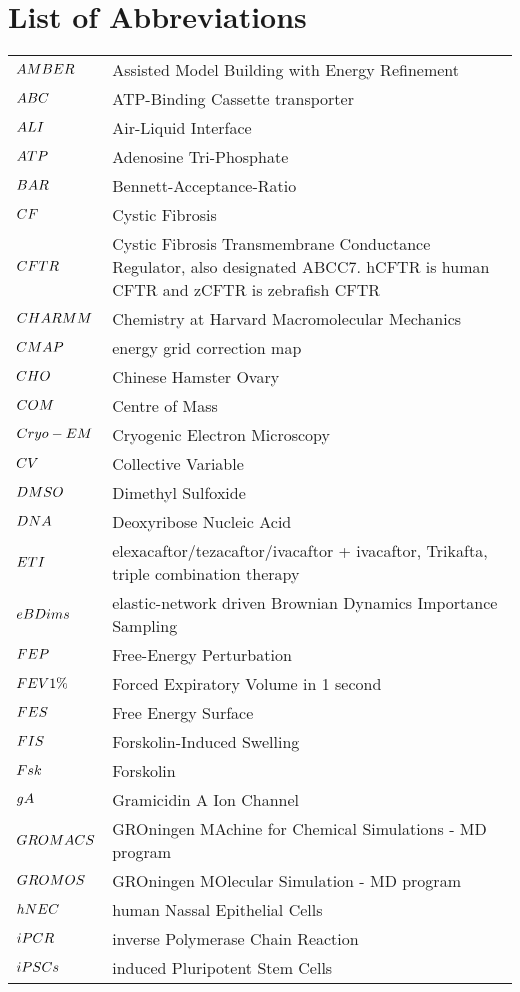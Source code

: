 \chapter*{List of Abbreviations}
\label{chap:abbrev}

\begin{center}
\begin{bfseries}
\newcommand\nomenclature[2]{#1 & #2 \\}
\begin{longtable}{@{}p{3cm}@{}p{\dimexpr\textwidth-1cm\relax}@{}}
\nomenclature{${\small AMBER}$}    {Assisted Model Building with Energy Refinement}
\nomenclature{${\small ABC}$}   {ATP-Binding Cassette transporter}
\nomenclature{${\small ALI}$}   {Air-Liquid Interface}
\nomenclature{${\small ATP}$}      {Adenosine Tri-Phosphate}
\nomenclature{${\small BAR}$}      {Bennett-Acceptance-Ratio}
\nomenclature{${\small CF}$}        {Cystic Fibrosis}
\nomenclature{${\small CFTR}$}      {Cystic Fibrosis Transmembrane Conductance Regulator, also designated ABCC7. hCFTR is human CFTR and zCFTR is zebrafish CFTR}
\nomenclature{${\small CHARMM}$}   {Chemistry at Harvard Macromolecular Mechanics}
\nomenclature{${\small CMAP}$}     {energy grid correction map}
\nomenclature{${\small CHO}$}      {Chinese Hamster Ovary}
\nomenclature{${\small COM}$}      {Centre of Mass}
\nomenclature{${\small Cryo-EM}$}  {Cryogenic Electron Microscopy}
\nomenclature{${\small CV}$}       {Collective Variable}
\nomenclature{${\small DMSO}$}     {Dimethyl Sulfoxide}
\nomenclature{${\small DNA}$}      {Deoxyribose Nucleic Acid}
\nomenclature{${\small ETI}$}      {elexacaftor/tezacaftor/ivacaftor + ivacaftor, Trikafta, triple combination therapy}
\nomenclature{${\small eBDims}$}   {elastic-network driven Brownian Dynamics Importance Sampling}
\nomenclature{${\small FEP}$}      {Free-Energy Perturbation}
\nomenclature{${\small FEV1\%}$}   {Forced Expiratory Volume in 1 second}
\nomenclature{${\small FES}$}      {Free Energy Surface}
\nomenclature{${\small FIS}$}      {Forskolin-Induced Swelling}
\nomenclature{${\small Fsk}$}      {Forskolin}
\nomenclature{${\small gA}$}       {Gramicidin A Ion Channel}
\nomenclature{${\small GROMACS}$}  {GROningen MAchine for Chemical Simulations - MD program}
\nomenclature{${\small GROMOS}$}   {GROningen MOlecular Simulation - MD program}
\nomenclature{${\small hNEC}$}     {human Nassal Epithelial Cells}
\nomenclature{${\small iPCR}$}     {inverse Polymerase Chain Reaction}
\nomenclature{${\small iPSCs}$}    {induced Pluripotent Stem Cells}

\end{longtable}
\end{bfseries}
\end{center}
